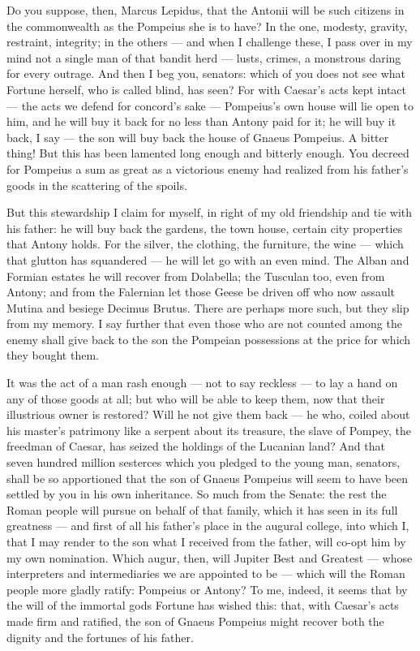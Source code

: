  Do you suppose, then, Marcus Lepidus, that the Antonii will be such citizens in the commonwealth as the Pompeius she is to have? In the one, modesty, gravity, restraint, integrity; in the others --- and when I challenge these, I pass over in my mind not a single man of that bandit herd --- lusts, crimes, a monstrous daring for every outrage. And then I beg you, senators: which of you does not see what Fortune herself, who is called blind, has seen? For with Caesar's acts kept intact --- the acts we defend for concord's sake --- Pompeius's own house will lie open to him, and he will buy it back for no less than Antony paid for it; he will buy it back, I say --- the son will buy back the house of Gnaeus Pompeius. A bitter thing! But this has been lamented long enough and bitterly enough. You decreed for Pompeius a sum as great as a victorious enemy had realized from his father's goods in the scattering of the spoils.

 But this stewardship I claim for myself, in right of my old friendship and tie with his father: he will buy back the gardens, the town house, certain city properties that Antony holds. For the silver, the clothing, the furniture, the wine --- which that glutton has squandered --- he will let go with an even mind. The Alban and Formian estates he will recover from Dolabella; the Tusculan too, even from Antony; and from the Falernian let those Geese be driven off who now assault Mutina and besiege Decimus Brutus. There are perhaps more such, but they slip from my memory. I say further that even those who are not counted among the enemy shall give back to the son the Pompeian possessions at the price for which they bought them.

 It was the act of a man rash enough --- not to say reckless --- to lay a hand on any of those goods at all; but who will be able to keep them, now that their illustrious owner is restored? Will he not give them back --- he who, coiled about his master's patrimony like a serpent about its treasure, the slave of Pompey, the freedman of Caesar, has seized the holdings of the Lucanian land? And that seven hundred million sesterces which you pledged to the young man, senators, shall be so apportioned that the son of Gnaeus Pompeius will seem to have been settled by you in his own inheritance. So much from the Senate: the rest the Roman people will pursue on behalf of that family, which it has seen in its full greatness --- and first of all his father's place in the augural college, into which I, that I may render to the son what I received from the father, will co-opt him by my own nomination. Which augur, then, will Jupiter Best and Greatest --- whose interpreters and intermediaries we are appointed to be --- which will the Roman people more gladly ratify: Pompeius or Antony? To me, indeed, it seems that by the will of the immortal gods Fortune has wished this: that, with Caesar's acts made firm and ratified, the son of Gnaeus Pompeius might recover both the dignity and the fortunes of his father.

